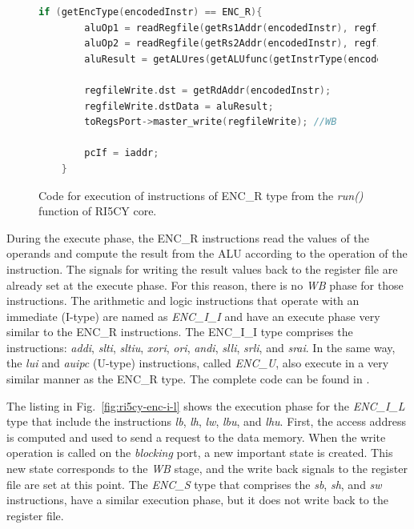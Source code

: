 \begin{figure}[htb!]
    \begin{lstlisting}[language=c++]
    if (getEncType(encodedInstr) == ENC_R){
        aluOp1 = readRegfile(getRs1Addr(encodedInstr), regfile);
        aluOp2 = readRegfile(getRs2Addr(encodedInstr), regfile);
        aluResult = getALUres(getALUfunc(getInstrType(encodedInstr)), aluOp1, aluOp2);
        
        regfileWrite.dst = getRdAddr(encodedInstr);
        regfileWrite.dstData = aluResult;
        toRegsPort->master_write(regfileWrite); //WB
        
        pcIf = iaddr;
    }\end{lstlisting}
    \caption{Code for execution of instructions of ENC\_R type from the \textit{run()} function of RI5CY core.}
    \label{fig:ri5cy-enc-r}
\end{figure}

During the execute phase, the ENC\_R instructions read the values of the operands and compute the result from the ALU according to the operation of the instruction. The signals for writing the result values back to the register file are already set at the execute phase. For this reason, there is no \textit{WB} phase for those instructions. The arithmetic and logic instructions that operate with an immediate (I-type) are named as \textit{ENC\_I\_I} and have an execute phase very similar to the ENC\_R instructions. The ENC\_I\_I type comprises the instructions: \textit{addi}, \textit{slti}, \textit{sltiu}, \textit{xori}, \textit{ori}, \textit{andi}, \textit{slli}, \textit{srli}, and \textit{srai}. In the same way, the \textit{lui} and \textit{auipc} (U-type) instructions, called \textit{ENC\_U}, also execute in a very similar manner as the ENC\_R type. The complete code can be found in \cite{descam}.

The listing in Fig.~\ref{fig:ri5cy-enc-i-l} shows the execution phase for the \textit{ENC\_I\_L} type that include the instructions \textit{lb}, \textit{lh}, \textit{lw}, \textit{lbu}, and \textit{lhu}. First, the access address is computed and used to send a request to the data memory. When the write operation is called on the \textit{blocking} port, a new important state is created. This new state corresponds to the \textit{WB} stage, and the write back signals to the register file are set at this point. The \textit{ENC\_S} type that comprises the \textit{sb}, \textit{sh}, and \textit{sw} instructions, have a similar execution phase, but it does not write back to the register file. 

